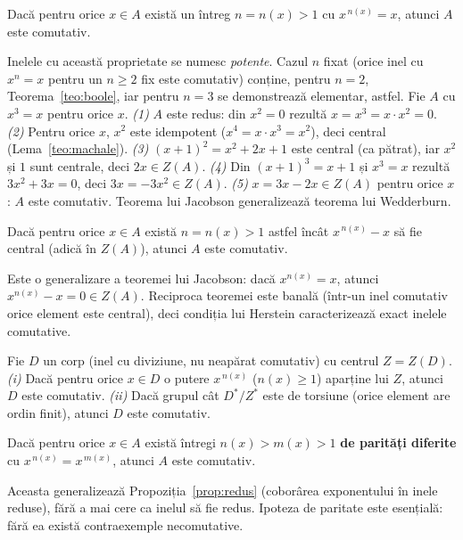 \begin{teorema}[Jacobson]\label{teo:jacobson}
Dacă pentru orice $x\in A$ există un întreg $n=n(x)>1$ cu $x^{\,n(x)}=x$, atunci $A$ este comutativ.
\end{teorema}

Inelele cu această proprietate se numesc \emph{potente}. Cazul $n$ fixat (orice inel cu $x^n=x$ pentru un $n\ge2$ fix este comutativ) conține, pentru $n=2$, Teorema~\ref{teo:boole}, iar pentru $n=3$ se demonstrează elementar, astfel. Fie $A$ cu $x^3=x$ pentru orice $x$. \emph{(1)} $A$ este redus: din $x^2=0$ rezultă $x=x^3=x\cdot x^2=0$. \emph{(2)} Pentru orice $x$, $x^2$ este idempotent ($x^4=x\cdot x^3=x^2$), deci central (Lema~\ref{teo:machale}). \emph{(3)} $(x+1)^2=x^2+2x+1$ este central (ca pătrat), iar $x^2$ și $1$ sunt centrale, deci $2x\in Z(A)$. \emph{(4)} Din $(x+1)^3=x+1$ și $x^3=x$ rezultă $3x^2+3x=0$, deci $3x=-3x^2\in Z(A)$. \emph{(5)} $x=3x-2x\in Z(A)$ pentru orice $x$: $A$ este comutativ. Teorema lui Jacobson generalizează teorema lui Wedderburn.

\begin{teorema}[Herstein]\label{teo:herstein}
Dacă pentru orice $x\in A$ există $n=n(x)>1$ astfel încât $x^{\,n(x)}-x$ să fie central (adică în $Z(A)$), atunci $A$ este comutativ.
\end{teorema}

Este o generalizare a teoremei lui Jacobson: dacă $x^{n(x)}=x$, atunci $x^{n(x)}-x=0\in Z(A)$. Reciproca teoremei este banală (într-un inel comutativ orice element este central), deci condiția lui Herstein caracterizează exact inelele comutative.

\begin{teorema}[Kaplansky]\label{teo:kaplansky}
Fie $D$ un corp (inel cu diviziune, nu neapărat comutativ) cu centrul $Z=Z(D)$.
\emph{(i)} Dacă pentru orice $x\in D$ o putere $x^{\,n(x)}$ ($n(x)\ge1$) aparține lui $Z$, atunci $D$ este comutativ.
\emph{(ii)} Dacă grupul cât $D^*/Z^*$ este de torsiune (orice element are ordin finit), atunci $D$ este comutativ.
\end{teorema}

\begin{teorema}\label{teo:parity}
Dacă pentru orice $x\in A$ există întregi $n(x)>m(x)>1$ \textbf{de parități diferite} cu $x^{\,n(x)}=x^{\,m(x)}$, atunci $A$ este comutativ.
\end{teorema}

Aceasta generalizează Propoziția~\ref{prop:redus} (coborârea exponentului în inele reduse), fără a mai cere ca inelul să fie redus. Ipoteza de paritate este esențială: fără ea există contraexemple necomutative.

